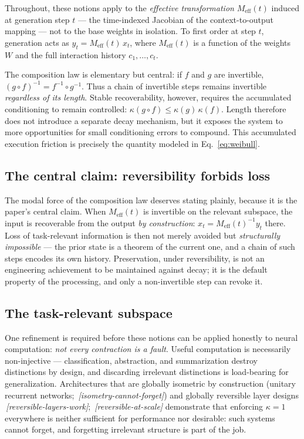 \documentclass[11pt]{article}
\theoremstyle{remark}
\newif\ifslugs \slugstrue  %
\newcommand{\slug}[1]{\ifslugs\,{\small\textit{[#1]}}\fi}
\newcommand{\Meff}{M_{\mathrm{eff}}}
\begin{document}
Throughout, these notions apply to the \emph{effective transformation}
$\Meff(t)$ induced at generation step $t$ --- the time-indexed Jacobian of the
context-to-output mapping --- not to the base weights in isolation. To first order at
step $t$, generation acts as $y_t = \Meff(t)\,x_t$, where $\Meff(t)$ is a function of
the weights $W$ and the full interaction history $c_1,\dots,c_t$.

The composition law is elementary but central: if $f$ and $g$ are invertible,
$(g \circ f)^{-1} = f^{-1} \circ g^{-1}$. Thus a chain of invertible steps
remains invertible \emph{regardless of its length}. Stable recoverability,
however, requires the accumulated conditioning to remain controlled:
$\kappa(g \circ f) \le \kappa(g)\,\kappa(f)$. Length therefore does not
introduce a separate decay mechanism, but it exposes the system to more
opportunities for small conditioning errors to compound. This accumulated
execution friction is precisely the quantity modeled in
Eq.~\eqref{eq:weibull}.

\subsection{The central claim: reversibility forbids loss}
\label{sec:modalcore}

The modal force of the composition law deserves stating plainly, because it is
the paper's central claim. When $\Meff(t)$ is invertible on the relevant subspace, the
input is recoverable from the output \emph{by construction}:
$x_t = \Meff(t)^{-1} y_t$ there. Loss of task-relevant information is then not
merely avoided but \emph{structurally impossible} --- the prior state is a
theorem of the current one, and a chain of such steps encodes its own history.
Preservation, under reversibility, is not an engineering achievement to be
maintained against decay; it is the default property of the processing, and
only a non-invertible step can revoke it.

\subsection{The task-relevant subspace}
\label{sec:vrel}

One refinement is required before these notions can be applied honestly to neural
computation: \emph{not every contraction is a fault}. Useful computation is
necessarily non-injective --- classification, abstraction, and summarization destroy
distinctions by design, and discarding irrelevant distinctions is load-bearing for
generalization. Architectures that are globally isometric by construction (unitary
recurrent networks; \citealp{arjovsky2016unitary}\slug{isometry-cannot-forget}) and globally reversible layer
designs \citep{gomez2017reversible}\slug{reversible-layers-work}; \citep{kitaev2020reformer}\slug{reversible-at-scale} demonstrate that enforcing
$\kappa = 1$ everywhere is neither sufficient for performance nor desirable: such
systems cannot forget, and forgetting irrelevant structure is part of the job.
\end{document}
